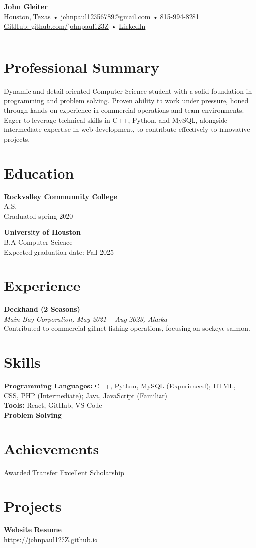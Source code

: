 \documentclass[a4paper]{article}
\begin{document}
\begin{center}
    {\LARGE \textbf{John Gleiter}} \\
    \color{graytext} Houston, Texas • \href{mailto:johnpaul12356789@gmail.com}{johnpaul12356789@gmail.com} • 815-994-8281 \\
    \href{https://github.com/johnpaul123Z}{GitHub: github.com/johnpaul123Z} • \href{https://linkedin.com}{LinkedIn}
\end{center}

\hrule

\section*{Professional Summary}
Dynamic and detail-oriented Computer Science student with a solid foundation in programming and problem solving. Proven ability to work under pressure, honed through hands-on experience in commercial operations and team environments. Eager to leverage technical skills in C++, Python, and MySQL, alongside intermediate expertise in web development, to contribute effectively to innovative projects.

\section*{Education}
\textbf{Rockvalley Communnity College}  \\
A.S.\\
Graduated spring 2020 

\textbf{University of Houston}  \\
B.A Computer Science \\
Expected graduation date: Fall 2025

\section*{Experience}
\textbf{Deckhand (2 Seasons)} \\
\textit{Main Bay Corporation, May 2021 – Aug 2023, Alaska}  \\
Contributed to commercial gillnet fishing operations, focusing on sockeye salmon.

\section*{Skills}
\textbf{Programming Languages:} C++, Python, MySQL (Experienced); HTML, CSS, PHP (Intermediate); Java, JavaScript (Familiar)  \\
\textbf{Tools:} React, GitHub, VS Code  \\
\textbf{Problem Solving}

\section*{Achievements}
Awarded Transfer Excellent Scholarship

\section*{Projects}
\textbf{Website Resume}  \\
\href{https://johnpaul123Z.github.io}{https://johnpaul123Z.github.io}
\end{document}
